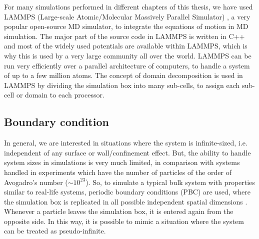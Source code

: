     
    For many simulations performed in different chapters of this thesis, we have used LAMMPS (Large-scale Atomic/Molecular Massively Parallel Simulator) \cite{lammps}, a very popular open-source MD simulator, to integrate the equations of motion in MD simulation. The major part of the source code in LAMMPS is written in C++ and most of the widely used potentials are available within LAMMPS, which is why this is used by a very large community all over the world. LAMMPS can be run very efficiently over a parallel architecture of computers, to handle a system of up to a few million atoms. The concept of domain decomposition is used in LAMMPS by dividing the simulation box into many sub-cells, to assign each sub-cell or domain to each processor.
    
    \subsection{Boundary condition}
    In general, we are interested in situations where the system is infinite-sized, i.e. independent of any surface or wall/confinement effect. But, the ability to handle system sizes in simulations is very much limited, in comparison with systems handled in experiments which have the number of particles of the order of Avogadro's number ($\sim 10^{23}$). So, to simulate a typical bulk system with properties similar to real-life systems, periodic boundary conditions (PBC) are used, where the simulation box is replicated in all possible independent spatial dimensions \cite{allen2017,frenkel2001understanding}. Whenever a particle leaves the simulation box, it is entered again from the opposite side. In this way, it is possible to mimic a situation where the system can be treated as pseudo-infinite.
    
